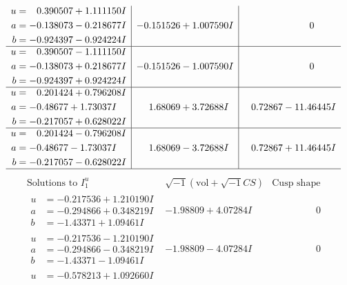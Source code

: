 \documentclass[1p]{elsarticle_modified}
\theoremstyle{definition}
\newcommand{\I}{\sqrt{-1}}
\begin{document}
$$\begin{array}{c|c|c}
\begin{aligned}
u &= \phantom{-}0.390507 + 1.111150 I \\
a &= -0.138073 - 0.218677 I \\
b &= -0.924397 - 0.924224 I\end{aligned}
 & -0.151526 + 1.007590 I & \phantom{-0.000000 } 0 \\ \hline\begin{aligned}
u &= \phantom{-}0.390507 - 1.111150 I \\
a &= -0.138073 + 0.218677 I \\
b &= -0.924397 + 0.924224 I\end{aligned}
 & -0.151526 - 1.007590 I & \phantom{-0.000000 } 0 \\ \hline\begin{aligned}
u &= \phantom{-}0.201424 + 0.796208 I \\
a &= -0.48677 + 1.73037 I \\
b &= -0.217057 + 0.628022 I\end{aligned}
 & \phantom{-}1.68069 + 3.72688 I & \phantom{-}0.72867 - 11.46445 I \\ \hline\begin{aligned}
u &= \phantom{-}0.201424 - 0.796208 I \\
a &= -0.48677 - 1.73037 I \\
b &= -0.217057 - 0.628022 I\end{aligned}
 & \phantom{-}1.68069 - 3.72688 I & \phantom{-}0.72867 + 11.46445 I\\
 \hline 
 \end{array}$$\newpage$$\begin{array}{c|c|c}  
\text{Solutions to }I^u_{1}& \I (\text{vol} + \sqrt{-1}CS) & \text{Cusp shape}\\
 \hline 
\begin{aligned}
u &= -0.217536 + 1.210190 I \\
a &= -0.294866 + 0.348219 I \\
b &= -1.43371 + 1.09461 I\end{aligned}
 & -1.98809 + 4.07284 I & \phantom{-0.000000 } 0 \\ \hline\begin{aligned}
u &= -0.217536 - 1.210190 I \\
a &= -0.294866 - 0.348219 I \\
b &= -1.43371 - 1.09461 I\end{aligned}
 & -1.98809 - 4.07284 I & \phantom{-0.000000 } 0 \\ \hline\begin{aligned}
u &= -0.578213 + 1.092660 I \\

\end{aligned}
\end{array}$$
\end{document}
